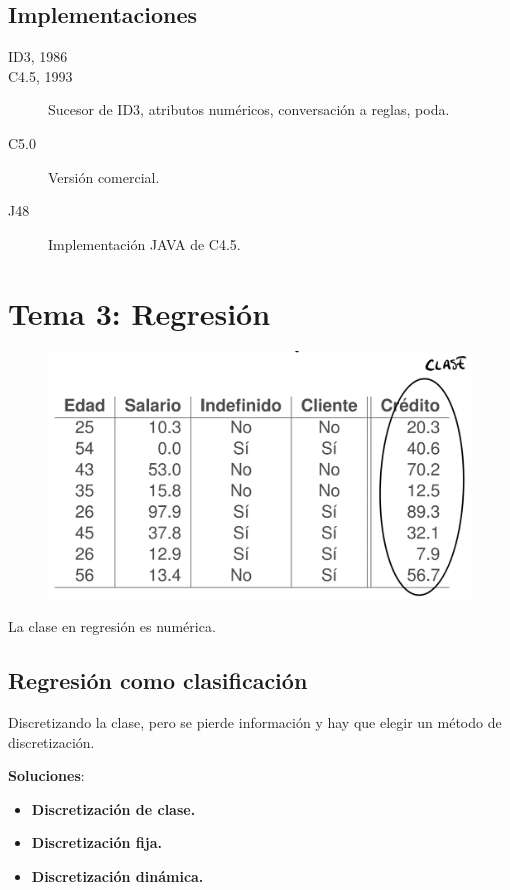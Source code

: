 \documentclass[12pt, twoside, openright]{report} %
\begin{document}
\section{Implementaciones}

\begin{description}
	\item[ID3, 1986]
	\item[C4.5, 1993] Sucesor de ID3, atributos numéricos, conversación a reglas, poda.
	\item[C5.0] Versión comercial.
	\item[J48] Implementación JAVA de C4.5.
\end{description}

\chapter{Tema 3: Regresión}
\begin{figure}[H]
	{\includegraphics[scale=.2]{image-20210305210244509.png}}
\end{figure}
La clase en regresión es numérica.

\section{Regresión como
clasificación}

Discretizando la clase, pero se pierde información y hay que elegir un
método de discretización.

\textbf{Soluciones}:

\begin{itemize}

\item
  \textbf{Discretización de clase.}
\item
  \textbf{Discretización fija.}
\item
  \textbf{Discretización dinámica.}
\end{itemize}
\end{document}
